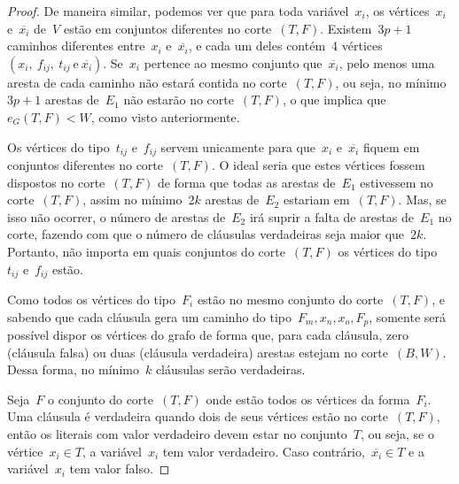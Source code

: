 \begin{proof}
		De maneira similar, podemos ver que para toda 
		variável~$x_i$, os vértices~$x_i$ e~$\overline{x_i}$
		de~$V$ estão em conjuntos diferentes no corte~$(T,F)$.
		Existem~$3p+1$ caminhos diferentes entre~$x_i$
		e~$\overline{x_i}$, e cada um deles contém~4
		vértices~${(x_i,\ f_{ij},\ t_{ij} \ \text{e}\ \overline{x_i})}$.
		Se~$x_i$ pertence ao mesmo conjunto que~$\overline{x_i}$,
		pelo menos uma aresta de cada caminho não estará contida
		no corte~$(T,F)$, ou seja, no mínimo~$3p+1$ arestas
		de~$E_1$ não estarão no corte~$(T,F)$, o que
		implica que~${e_G(T,F)< W}$, como visto anteriormente.

		Os vértices do tipo~$t_{ij}$ e~$f_{ij}$ servem unicamente
		para que~$x_i$ e~$\overline{x_i}$ fiquem em conjuntos
		diferentes no corte~$(T,F)$.
		O ideal seria que estes vértices fossem dispostos no 
		corte~$(T,F)$ de forma que todas as arestas de~$E_1$ 
		estivessem no corte~$(T,F)$, assim no mínimo~$2k$ arestas 
		de~$E_2$ estariam em~$(T,F)$.
		Mas, se isso não ocorrer,
		o número de arestas de~$E_2$ irá suprir a falta de arestas
		de~$E_1$ no corte,
		fazendo com que o número de cláusulas verdadeiras seja maior
		que~$2k$.
		Portanto, não importa em quais conjuntos do corte~$(T,F)$ os 
		vértices do tipo~$t_{ij}$ e~$f_{ij}$ estão.

		Como todos os vértices do tipo~$F_i$ estão no mesmo conjunto
		do corte~$(T,F)$, e sabendo que cada cláusula gera um 
		caminho do tipo~$F_m,x_n,x_o,F_p$, somente será possível
		dispor os vértices do grafo de forma que, para cada cláusula,
		zero (cláusula falsa) ou duas (cláusula verdadeira) arestas 
		estejam no corte~$(B,W)$.
		Dessa forma, no mínimo~$k$ cláusulas serão verdadeiras. 

		Seja~$F$ o conjunto do corte~$(T,F)$ onde estão todos os vértices
		da forma~$F_i$.
		Uma cláusula é verdadeira quando dois de seus vértices
		estão no corte~$(T,F)$, então os literais com valor verdadeiro
		devem estar no conjunto~$T$,
		ou seja, 
		se o vértice~$x_i\in T$, a variável~$x_i$ tem valor verdadeiro.
		Caso contrário,~$\overline{x_i}\in T$ e a variável~$x_i$ tem valor falso.
	\end{proof}






